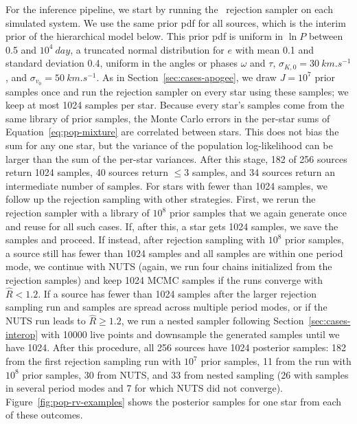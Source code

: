 \documentclass[twocolumn]{AASTeX7/aastex701}
\newcommand{\harv}{\package{harv}}
\begin{document}
For the inference pipeline, we start by running the \harv\ rejection sampler on each
simulated system.
We use the same prior pdf for all sources, which is the interim prior of the
hierarchical model below.
This prior pdf is uniform in $\ln P$ between 0.5 and $10^4~\unit{day}$, a truncated
normal distribution for $e$ with mean 0.1 and standard deviation 0.4, uniform in the
angles or phases $\omega$ and $\tau$, $\sigma_{K,0} = 30~\unit{km.s^{-1}}$, and
$\sigma_{v_0} = 50~\unit{km.s^{-1}}$.
As in Section~\ref{sec:cases-apogee}, we draw $J = 10^7$ prior samples once and run the
rejection sampler on every star using these samples; we keep at most 1024 samples per
star.
Because every star's samples come from the same library of prior samples, the Monte
Carlo errors in the per-star sums of Equation~\ref{eq:pop-mixture} are correlated
between stars.
This does not bias the sum for any one star, but the variance of the population
log-likelihood can be larger than the sum of the per-star variances.
After this stage, 182 of 256 sources return 1024 samples, 40 sources return $\leq3$
samples, and 34 sources return an intermediate number of samples.
For stars with fewer than 1024 samples, we follow up the rejection sampling with other
strategies.
First, we rerun the rejection sampler with a library of $10^8$ prior samples that we
again generate once and reuse for all such cases.
If, after this, a star gets 1024 samples, we save the samples and proceed.
If instead, after rejection sampling with $10^8$ prior samples, a source still has fewer
than 1024 samples and all samples are within one period mode, we continue with NUTS
(again, we run four chains initialized from the rejection samples) and keep 1024 MCMC
samples if the runs converge with $\hat{R} < 1.2$.
If a source has fewer than 1024 samples after the larger rejection sampling run and
samples are spread across multiple period modes, or if the NUTS run leads to $\hat{R}
\geq 1.2$, we run a nested sampler following Section~\ref{sec:cases-interop} with
\num{10000} live points and downsample the generated samples until we have 1024.
After this procedure, all 256 sources have 1024 posterior samples: 182 from the first
rejection sampling run with $10^7$ prior samples, 11 from the run with $10^8$ prior
samples, 30 from NUTS, and 33 from nested sampling (26 with samples in several period
modes and 7 for which NUTS did not converge).
Figure~\ref{fig:pop-rv-examples} shows the posterior samples for one star from each of
these outcomes.
\end{document}
